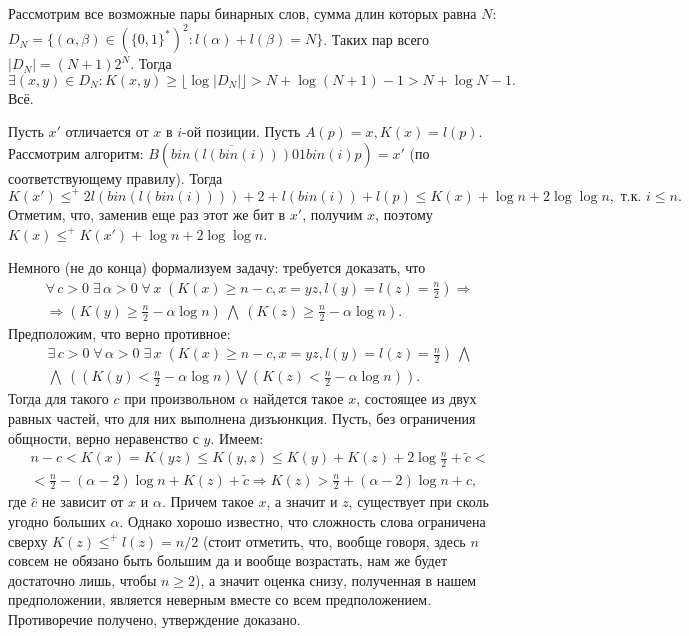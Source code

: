 Рассмотрим все возможные пары бинарных слов, сумма длин которых равна $N$: $D_N=\{ (\alpha,\beta)\in\left(\{0,1\}^*\right)^2 \colon l(\alpha)+l(\beta)=N \}$. Таких пар всего $|D_N|=(N+1)2^N$. Тогда $\exists (x,y)\in D_N \colon K(x,y)\ge \lfloor\log |D_N|\rfloor > N+\log (N+1)-1 > N+\log N -1.$ Всё.


Пусть $x'$ отличается от $x$ в $i$-ой позиции. Пусть $A(p)=x, K(x)=l(p)$. Рассмотрим алгоритм: $B\left(\overline{bin(l(bin(i)))}01bin(i)p\right)=x'$ (по соответствующему правилу). Тогда $$K(x')\le^+2l(bin(l(bin(i))))+2+l(bin(i))+l(p)\le K(x)+\log n + 2\log\log n,\text{ т.к. }i\le n.$$ Отметим, что, заменив еще раз этот же бит в $x'$, получим $x$, поэтому $K(x)\le^+ K(x')+\log n + 2\log\log n$.


Немного (не до конца) формализуем задачу: требуется доказать, что  
\begin{multline*}
\forall \,c>0\; \exists \,\alpha>0 \; \forall \,x \; \left(K(x)\ge n-c , x=yz , l(y)=l(z)=\frac n2 \right ) 
\Rightarrow \\ \Rightarrow
\left( K(y)\ge \frac n2-\alpha \log n\right)\: \bigwedge \: \left(K(z)\ge \frac n2-\alpha \log n\right).
\end{multline*}
Предположим, что верно противное:
\begin{multline*}
\exists \,c>0\; \forall \,\alpha>0 \; \exists \,x \; \left(K(x)\ge n-c, x=yz, l(y)=l(z)=\frac n2 \right) 
\: \bigwedge \\ \bigwedge \: \left(\left( K(y)<  \frac n2-\alpha \log n\right) \bigvee \left( K(z)<  \frac n2-\alpha \log n\right) \right).
\end{multline*}
Тогда для такого $c$ при произвольном $\alpha$ найдется такое $x$, состоящее из двух равных частей, что для них выполнена дизъюнкция. Пусть, без ограничения общности, верно неравенство с $y$. Имеем:
\begin{multline*} 
n-c < K(x) = K(yz) \le K(y,z) \le K(y)+K(z)+2\log \frac n2 + \tilde c <\\< \frac n2 -(\alpha-2)\log n + K(z) +\tilde c \Rightarrow K(z) > \frac n2 +(\alpha-2)\log n + \hat c,
\end{multline*}
где $\hat c$ не зависит от $x$ и $\alpha$.
Причем такое $x$, а значит и $z$, существует при сколь угодно больших $\alpha$. Однако хорошо известно, что сложность слова ограничена сверху $K(z)\le^+ l(z)=n/2$ (стоит отметить, что, вообще говоря, здесь $n$ совсем не обязано быть большим да и вообще возрастать, нам же будет достаточно лишь, чтобы $n\ge2$), а значит оценка снизу, полученная в нашем предположении, является неверным вместе со всем предположением. Противоречие получено, утверждение доказано.


